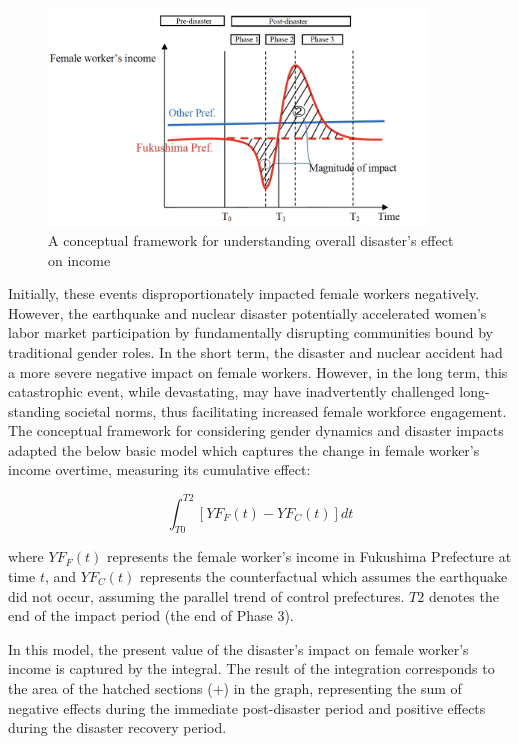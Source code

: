 \documentclass[a4paper,12pt]{article}
\begin{document}
\begin{figure}[h!]
    \centering
    \includegraphics[width=0.9\textwidth]{A conceptual model.jpeg}  %
    \caption{A conceptual framework for understanding overall disaster's effect on income}
    \label{fig:conceptual_model}
\end{figure}


Initially, these events disproportionately impacted female workers negatively. However, the earthquake and nuclear disaster potentially accelerated women's labor market participation by fundamentally disrupting communities bound by traditional gender roles. In the short term, the disaster and nuclear accident had a more severe negative impact on female workers. However, in the long term, this catastrophic event, while devastating, may have inadvertently challenged long-standing societal norms, thus facilitating increased female workforce engagement. The conceptual framework for considering gender dynamics and disaster impacts adapted the below basic model which captures the change in female worker's income overtime, measuring its cumulative effect:

\begin{equation}
\int_{T0}^{T2} [YF_F(t) - YF_C(t)] dt
\end{equation}

where $YF_F(t)$ represents the female worker's income in Fukushima Prefecture at time $t$, and $YF_C(t)$ represents the counterfactual which assumes the earthquake did not occur, assuming the parallel trend of control prefectures. $T2$ denotes the end of the impact period (the end of Phase 3).

In this model, the present value of the disaster's impact on female worker's income is captured by the integral. The result of the integration corresponds to the area of the hatched sections (+) in the graph, representing the sum of negative effects during the immediate post-disaster period and positive effects during the disaster recovery period.
\end{document}
